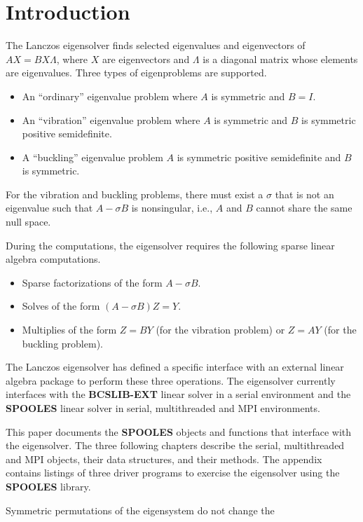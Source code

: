 \chapter{Introduction}
\label{chapter:introduction}
\par
The Lanczos eigensolver 
finds selected eigenvalues and eigenvectors of 
$AX = B X \Lambda$, where $X$ are eigenvectors
and $\Lambda$ is a diagonal matrix whose elements are eigenvalues.
Three types of eigenproblems are supported.
\begin{itemize}
\item 
An ``ordinary'' eigenvalue problem 
where $A$ is symmetric and $B = I$.
\item 
An ``vibration'' eigenvalue problem 
where $A$ is symmetric and 
$B$ is symmetric positive semidefinite.
\item 
A ``buckling'' eigenvalue problem 
$A$ is symmetric positive semidefinite and
$B$ is symmetric.
\end{itemize}
For the vibration and buckling problems, there must exist a
$\sigma$ that is not an eigenvalue such that
$A - \sigma B$ is nonsingular,
i.e., $A$ and $B$ cannot share the same null space.
\par
During the computations, the eigensolver requires the following
sparse linear algebra computations.
\begin{itemize}
\item
Sparse factorizations of the form $A - \sigma B$.
\item
Solves of the form $(A - \sigma B) Z = Y$.
\item
Multiplies of the form $Z = B Y$ (for the vibration problem)
or $Z = A Y$ (for the buckling problem).
\end{itemize}
The Lanczos eigensolver has defined a specific interface with an
external linear algebra package to perform these three operations.
The eigensolver currently interfaces with the {\bf BCSLIB-EXT} linear
solver in a serial environment and the {\bf SPOOLES} linear solver
in serial, multithreaded and MPI environments.
\par
This paper documents the {\bf SPOOLES} objects and functions
that interface with the eigensolver.
The three following chapters describe the serial, multithreaded and
MPI objects, their data structures, and their methods.
The appendix contains listings of three driver programs to exercise
the eigensolver using the {\bf SPOOLES} library.
\par
Symmetric permutations of the eigensystem do not change the
